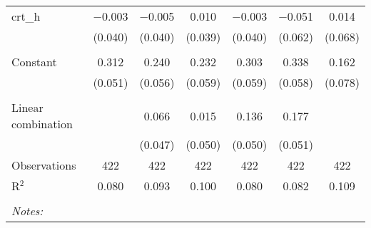 \begin{table}[!htbp]
\begin{tabular}{@{\extracolsep{5pt}}lcccccc}
 crt\_h & $-$0.003 & $-$0.005 & 0.010 & $-$0.003 & $-$0.051 & 0.014 \\ 
  & (0.040) & (0.040) & (0.039) & (0.040) & (0.062) & (0.068) \\ 
  & & & & & & \\ 
 Constant & 0.312 & 0.240 & 0.232 & 0.303 & 0.338 & 0.162 \\ 
  & (0.051) & (0.056) & (0.059) & (0.059) & (0.058) & (0.078) \\ 
  & & & & & & \\ 
Linear combination &   & 0.066 & 0.015 & 0.136 & 0.177 &  \\ 
 &  & (0.047) & (0.050) & (0.050) & (0.051) &  \\ 
Observations & 422 & 422 & 422 & 422 & 422 & 422 \\ 
R$^{2}$ & 0.080 & 0.093 & 0.100 & 0.080 & 0.082 & 0.109 \\ 
\hline \\[-1.8ex] 
\textit{Notes:} & \multicolumn{6}{l}{} \\ 
\end{tabular} 
\end{table} 
